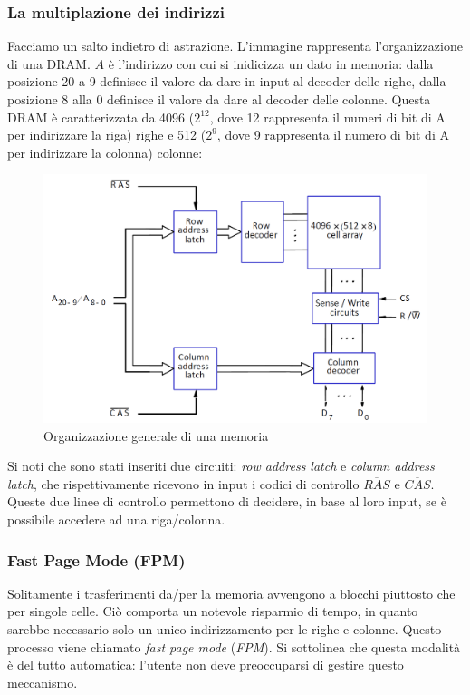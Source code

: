 \documentclass[class=book, crop=false, oneside]{standalone}
\begin{document}
\subsubsection{La multiplazione dei indirizzi}
Facciamo un salto indietro di astrazione. L'immagine rappresenta l'organizzazione di una DRAM. \(A\) è l'indirizzo con cui si inidicizza un dato in memoria: dalla posizione 20 a 9 definisce il valore da dare in input al decoder delle righe, dalla posizione 8 alla 0 definisce il valore da dare al decoder delle colonne. Questa DRAM è caratterizzata da 4096 (\(2^{12}\), dove 12 rappresenta il numeri di bit di A per indirizzare la riga) righe e 512 (\(2^9\), dove 9 rappresenta il numero di bit di A per indirizzare la colonna) colonne:
\begin{figure}[H]
	\centering
	\includegraphics[width=\textwidth,keepaspectratio]{organizzazione_generale.png}
	\caption{Organizzazione generale di una memoria}
\end{figure}
Si noti che sono stati inseriti due circuiti: \emph{row address latch} e \emph{column address latch}, che rispettivamente ricevono in input i codici di controllo \emph{\(\overline{RAS}\)} e \emph{\(\overline{CAS}\)}. Queste due linee di controllo permettono di decidere, in base al loro input, se è possibile accedere ad una riga/colonna.

\subsubsection{Fast Page Mode (FPM)}\label{sec:FPM}
Solitamente i trasferimenti da/per la memoria avvengono a blocchi piuttosto che per singole celle. Ciò comporta un notevole risparmio di tempo, in quanto sarebbe necessario solo un unico indirizzamento per le righe e colonne. Questo processo viene chiamato \emph{fast page mode} (\emph{FPM}). Si sottolinea che questa modalità è del tutto automatica: l'utente non deve preoccuparsi di gestire questo meccanismo.
\end{document}
